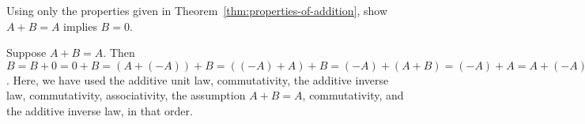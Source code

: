 \begin{ex} Using only the properties given in
  Theorem~\ref{thm:properties-of-addition}, show $A+B=A$ implies $B=0$.
  \begin{sol}
    Suppose $A+B=A$. Then $B=B+0=0+B=(A+(-A))+B = ((-A)+A)+B =
    (-A)+(A+B) = (-A)+A = A+(-A) = 0$. Here, we have used the additive
    unit law, commutativity, the additive inverse law, commutativity,
    associativity, the assumption $A+B=A$, commutativity, and the
    additive inverse law, in that order.
  \end{sol}
\end{ex}

